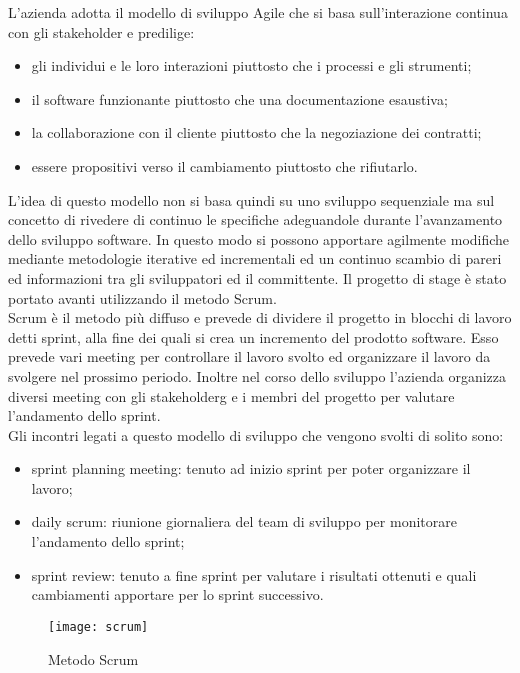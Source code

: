 L'azienda adotta il modello di sviluppo Agile che si basa sull'interazione continua con gli stakeholder e predilige:
\begin{itemize}
	\item gli individui e le loro interazioni piuttosto che i processi e gli strumenti;
	\item il software funzionante piuttosto che una documentazione esaustiva;
	\item la collaborazione con il cliente piuttosto che la negoziazione dei contratti;
	\item essere propositivi verso il cambiamento piuttosto che rifiutarlo.
\end{itemize}
L'idea di questo modello non si basa quindi su uno sviluppo sequenziale ma sul concetto di rivedere di continuo le specifiche adeguandole durante l'avanzamento dello sviluppo software. In questo modo si possono apportare agilmente modifiche mediante metodologie iterative ed incrementali ed un continuo scambio di pareri ed informazioni tra gli sviluppatori ed il committente. Il progetto di stage è stato portato avanti utilizzando il metodo Scrum.\\
Scrum è il metodo più diffuso e prevede di dividere il progetto in blocchi di lavoro detti sprint, alla fine dei quali si crea un incremento del prodotto software. Esso prevede vari meeting per controllare il lavoro svolto ed organizzare il lavoro da svolgere nel prossimo periodo. Inoltre nel corso dello sviluppo l'azienda organizza diversi meeting con gli \gls{stakeholderg} e i membri del progetto per valutare l'andamento dello sprint.\\
Gli incontri legati a questo modello di sviluppo che vengono svolti di solito sono:
\begin{itemize}
	\item sprint planning meeting: tenuto ad inizio sprint per poter organizzare il lavoro;
	\item daily scrum: riunione giornaliera del team di sviluppo per monitorare l'andamento dello sprint;
	\item sprint review: tenuto a fine sprint per valutare i risultati ottenuti e quali cambiamenti apportare per lo sprint successivo.
\end{itemize}
\begin{figure}[H]
	\begin{center}
		\texttt{[image: scrum]}
		\caption{Metodo Scrum}
	\end{center}
\end{figure}
